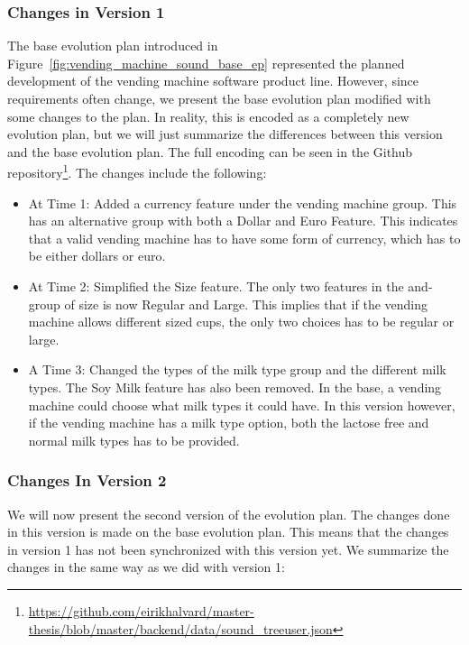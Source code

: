 \documentclass[a4paper,english]{ifimaster}
\begin{document}
\subsubsection{Changes in Version 1}%
\label{ssub:changes_in_version_1}

The base evolution plan introduced in Figure~\vref{fig:vending_machine_sound_base_ep} represented the planned development of the vending machine software product line. However, since requirements often change, we present the base evolution plan modified with some changes to the plan. In reality, this is encoded as a completely new evolution plan, but we will just summarize the differences between this version and the base evolution plan. The full encoding can be seen in the Github repository\footnote{\url{https://github.com/eirikhalvard/master-thesis/blob/master/backend/data/sound\_treeuser.json}}. The changes include the following:

\begin{itemize}
  \item At Time 1: Added a currency feature under the vending machine group. This has an alternative group with both a Dollar and Euro Feature. This indicates that a valid vending machine has to have some form of currency, which has to be either dollars or euro. 
  \item At Time 2: Simplified the Size feature. The only two features in the and-group of size is now Regular and Large. This implies that if the vending machine allows different sized cups, the only two choices has to be regular or large.
  \item A Time 3: Changed the types of the milk type group and the different milk types. The Soy Milk feature has also been removed. In the base, a vending machine could choose what milk types it could have. In this version however, if the vending machine has a milk type option, both the lactose free and normal milk types has to be provided.
\end{itemize}

\subsubsection{Changes In Version 2}%
\label{ssub:changes_in_version_2}

We will now present the second version of the evolution plan. The changes done in this version is made on the base evolution plan. This means that the changes in version 1 has not been synchronized with this version yet. We summarize the changes in the same way as we did with version 1:
\end{document}
